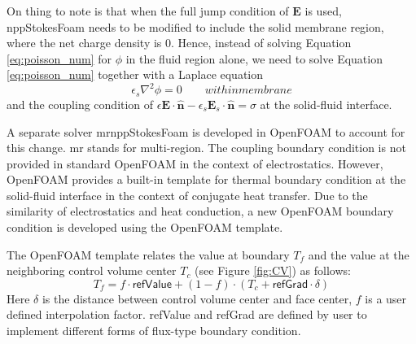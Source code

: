 On thing to note is that when the full jump condition of $\mathbf{E}$ is used, \textsf{nppStokesFoam} needs to be modified to include the solid membrane region, where the net charge density is 0. Hence, instead of solving Equation \ref{eq:poisson_num} for $\phi$ in the fluid region alone, we need to solve Equation \ref{eq:poisson_num} together with a Laplace equation
\begin{equation}
\epsilon_s \nabla^2 \phi = 0 \qquad within membrane
\label{eq:laplace_num}
\end{equation}
and the coupling condition of $\epsilon \mathbf{E} \cdot  \hat{\mathbf{n}} - \epsilon_{s} \mathbf{E}_{s} \cdot \hat{\mathbf{n}} = \sigma$ at the solid-fluid interface. 

A separate solver \textsf{mrnppStokesFoam} is developed in OpenFOAM to account for this change. \textsf{mr} stands for multi-region. The coupling boundary condition is not provided in standard OpenFOAM in the context of electrostatics. However, OpenFOAM provides a built-in template for thermal boundary condition at the solid-fluid interface in the context of conjugate heat transfer. Due to the similarity of electrostatics and heat conduction, a new OpenFOAM boundary condition is developed using the OpenFOAM template.

The OpenFOAM template relates the value at boundary $T_f$ and the value at the neighboring control volume center $T_c$ (see Figure \ref{fig:CV}) as follows:
\begin{equation}
T_f = f\cdot \mathsf{refValue} + (1-f)\cdot(T_c + \mathsf{refGrad}\cdot\delta)
\label{eq:OF_BC}
\end{equation}
Here $\delta$ is the distance between control volume center and face center, $f$ is a user defined interpolation factor. \textsf{refValue} and \textsf{refGrad} are defined by user to implement different forms of flux-type boundary condition.

